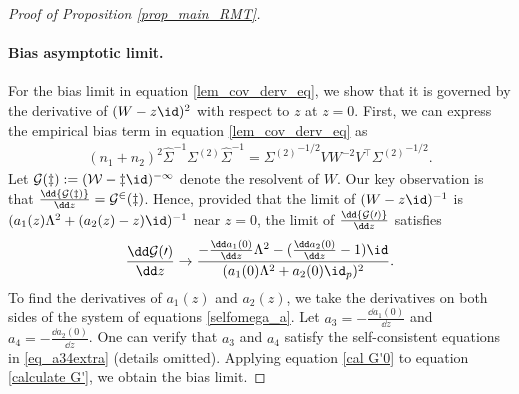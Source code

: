 \documentclass[aos,preprint]{imsart}
\begin{document}
\begin{proof}[Proof of Proposition \ref{prop_main_RMT}]
 \paragraph{Bias asymptotic limit.}
 For the bias limit in equation \eqref{lem_cov_derv_eq}, we show that it is governed by the derivative of $(W - z\id)^2$ with respect to $z$ at $z = 0$.
First, we can express the empirical bias term in equation \eqref{lem_cov_derv_eq} as %
\begin{align}\label{calculate G'}
	(n_1 + n_2)^2 \hat{\Sigma}^{-1}\Sigma^{(2)}\hat{\Sigma}^{-1} = {\Sigma^{(2)}}^{-1/2} V W^{-2} V^{\top} {\Sigma^{(2)}}^{-1/2}.
\end{align}
Let $\cal G(z):=(W-z\id )^{-1}$ denote the resolvent of $W$.
Our key observation is that $\frac{\dd{\cal G(z)}}{\dd z} =  \cal G^2(z)$.
Hence, provided that the limit of $(W - z\id)^{-1}$ is $(a_1(z) \Lambda^2 + (a_2(z) - z) \id)^{-1}$ near $z = 0$, the limit of $\frac{\dd{\cal G(0)}}{\dd z}$ satisfies
\begin{align}\label{cal G'0}
	\frac{\dd \cal G(0)}{\dd z} \to \frac{-\frac{\dd a_1(0)}{\dd z}\Lambda^2 - (\frac{\dd a_2(0)}{\dd z} - 1)\id}{(a_{1}(0)\Lambda^2 + a_{2}(0)\id_p)^2}.
\end{align}
To find the derivatives of $a_1(z)$ and $a_2(z)$, we take the derivatives on both sides of the system of equations \eqref{selfomega_a}.
Let $a_3 = - \frac{\dd a_1(0)}{\dd z}$ and $a_4 = - \frac{\dd a_2(0)}{\dd z}$.
One can verify that $a_3$ and $a_4$ satisfy the self-consistent equations in \eqref{eq_a34extra} (details omitted).
Applying equation \eqref{cal G'0} to equation \eqref{calculate G'}, we obtain the bias limit.


\end{proof}
\end{document}
